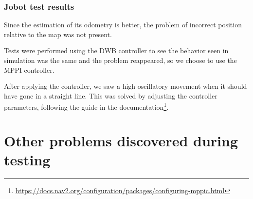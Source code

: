 \subsubsection{Jobot test results}

Since the estimation of its odometry is better, the problem of incorrect position relative to the map was not present.

Tests were performed using the DWB controller to see the behavior seen in simulation was the same and the problem reappeared, so we choose to use the MPPI controller.

After applying the controller, we saw a high oscillatory movement when it should have gone in a straight line. This was solved by adjusting the controller parameters, following the guide in the documentation\footnote{\href{https://docs.nav2.org/configuration/packages/configuring-mppic.html}{https://docs.nav2.org/configuration/packages/configuring-mppic.html}}.
\newpage
\section{Other problems discovered during testing}

